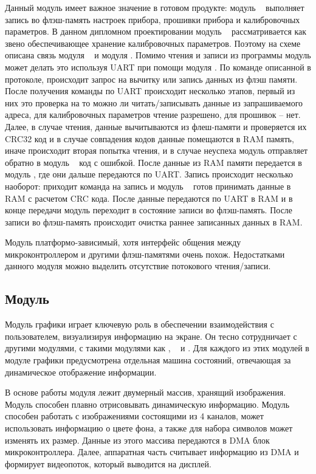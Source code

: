 Данный модуль имеет важное значение в готовом продукте: модуль \moduleFlashMemory~ выполняет запись во флэш-память настроек прибора,
прошивки прибора и калибровочных параметров. В данном дипломном проектировании модуль \moduleFlashMemory~ рассматривается как звено
обеспечивающее хранение калибровочных параметров. Поэтому на схеме описана связь модуля \moduleFlashMemory~ и модуля \moduleCalib.
Помимо чтения и записи из программы модуль может делать это используя UART при помощи модуля \moduleUart.
По команде описанной в протоколе, происходит запрос на вычитку или запись данных из флэш памяти.
После получения команды по UART происходит несколько этапов, первый из них это проверка на то можно ли читать/записывать данные из запрашиваемого адреса,
для калибровочных параметров чтение разрешено, для прошивок  -- нет. Далее, в случае чтения, данные вычитываются из флеш-памяти и проверяется их CRC32
код и в случае совпадения кодов данные помещаются в RAM память, иначе происходит вторая попытка чтения, и в случае неуспеха модуль отправляет обратно в 
модуль \moduleUart~ код с ошибкой. После данные из RAM памяти передается в модуль \moduleUart, где они дальше передаются по UART. Запись происходит несколько наоборот:
приходит команда на запись и модуль \moduleFlashMemory~ готов принимать данные в RAM с расчетом CRC кода. После данные передаются по UART в RAM и в конце передачи модуль переходит в состояние
записи во флэш-память. После записи во флэш-память происходит очистка раннее записанных данных в RAM.

Модуль платформо-зависимый, хотя интерфейс общения между микроконтроллером и другими 
флэш-памятями очень похож. Недостатками данного модуля можно выделить отсутствие потокового чтения/записи.


\subsection{Модуль \moduleGraphics}

Модуль графики играет ключевую роль в обеспечении взаимодействия с пользователем, визуализируя информацию на экране.
Он тесно сотрудничает с другими модулями,  с такими модулями как \moduleMoveDetect, \moduleOrientationAzimuth~ и \moduleFindTarget.
Для каждого из этих модулей в модуле графики предусмотрена отдельная машина состояний, отвечающая за динамическое
отображение информации.

В основе работы модуля лежит двумерный массив, 
хранящий изображения. Модуль способен плавно отрисовывать динамическую информацию.
Модуль способен работать с изображениями состоящими из 4 каналов, может использовать информацию о цвете фона, а также для набора символов может
изменять их размер.
Данные из этого массива передаются в DMA блок микроконтроллера. 
Далее, аппаратная часть считывает информацию из DMA и формирует видеопоток, который выводится на дисплей.

